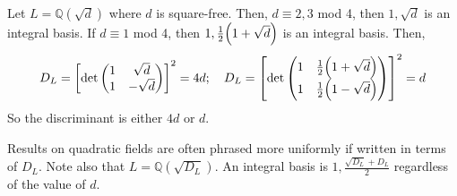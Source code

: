 \begin{example}
    Let \( L = \mathbb Q(\sqrt{d}) \) where \( d \) is square-free.
    Then, \( d \equiv 2, 3 \) mod 4, then \( 1, \sqrt{d} \) is an integral basis.
    If \( d \equiv 1 \) mod 4, then \( 1, \frac{1}{2}\qty(1+\sqrt{d}) \) is an integral basis.
    Then,
    \[ D_L = \qty[\det \begin{pmatrix}
        1 & \sqrt{d} \\
        1 & -\sqrt{d}
    \end{pmatrix}]^2 = 4d;\quad D_L = \qty[\det \begin{pmatrix}
        1 & \frac{1}{2}\qty(1 + \sqrt{d}) \\
        1 & \frac{1}{2}\qty(1 - \sqrt{d})
    \end{pmatrix}]^2 = d \]
    So the discriminant is either \( 4d \) or \( d \).
\end{example}
\begin{remark}
    Results on quadratic fields are often phrased more uniformly if written in terms of \( D_L \).
    Note also that \( L = \mathbb Q(\sqrt{D_L}) \).
    An integral basis is \( 1, \frac{\sqrt{D_L} + D_L}{2} \) regardless of the value of \( d \).
\end{remark}

